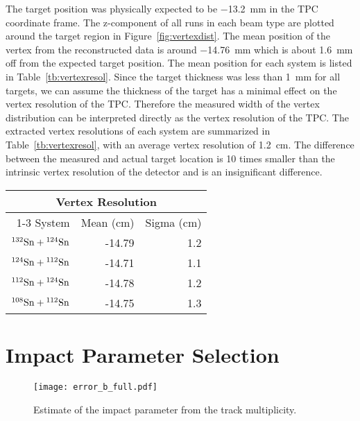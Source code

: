  The target position was physically expected to be \SI{-13.2}{\milli\metre} in the TPC coordinate frame. The z-component of all runs in each beam type are plotted around the target region in Figure~\ref{fig:vertexdist}. The mean position of the vertex from the reconstructed data is around \SI{-14.76}{\milli\metre} which is about \SI{1.6}{\milli\metre} off from the expected target position. The mean position for each system is listed in Table~\ref{tb:vertexresol}. Since the target thickness was less than \SI{1}{\milli\metre} for all targets, we can assume the thickness of the target has a minimal effect on the vertex resolution of the TPC. Therefore the measured width of the vertex distribution can be interpreted directly as the vertex resolution of the TPC. The extracted vertex resolutions of each system are summarized in Table~\ref{tb:vertexresol}, with an average vertex resolution of \SI{1.2}{\centi\metre}. The difference between the measured and actual target location is 10 times smaller than the intrinsic vertex resolution of the detector and is an insignificant difference.  



\begin{table*}\centering
{}
\begin{tabular}{@{}rrr@{}}\toprule
\multicolumn{3}{c}{Vertex Resolution}\\
\cmidrule{1-3}
System & Mean (cm) & Sigma (cm) \\
\midrule
${}^{132}\mathrm{Sn} + {}^{124}\mathrm{Sn}$ & -14.79  & 1.2 \\
${}^{124}\mathrm{Sn} + {}^{112}\mathrm{Sn}$ & -14.71  & 1.1 \\
${}^{112}\mathrm{Sn} + {}^{124}\mathrm{Sn}$ & -14.78  & 1.2 \\
${}^{108}\mathrm{Sn} + {}^{112}\mathrm{Sn}$ & -14.75  & 1.3 \\ 
\bottomrule
\end{tabular}
\caption{Summary of the mean vertex location for the target position in all systems and the measured vertex resolution.}
\label{tb:vertexresol}
\end{table*}


\clearpage

\section{Impact Parameter Selection}
\label{sec:impact}

\begin{figure}[htb]
\centering
\texttt{[image: error\_b\_full.pdf]}
\caption{Estimate of the impact parameter from the track multiplicity.}
\label{fig:impactPar}
\end{figure}

